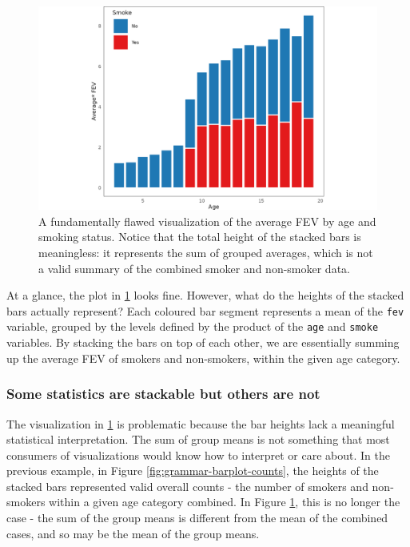 \documentclass[
]{book}
\theoremstyle{definition}
\theoremstyle{definition}
\theoremstyle{definition}
\theoremstyle{definition}
\theoremstyle{remark}
\begin{document}
\begin{figure}

{\centering \includegraphics[width=1\linewidth,height=1\textheight]{./figures/grammar-barplot-means} 

}

\caption{A fundamentally flawed visualization of the average FEV by age and smoking status. Notice that the total height of the stacked bars is meaningless: it represents the sum of grouped averages, which is not a valid summary of the combined smoker and non-smoker data.}\label{fig:grammar-barplot-means}
\end{figure}

At a glance, the plot in \ref{fig:grammar-barplot-means} looks fine. However, what do the heights of the stacked bars actually represent? Each coloured bar segment represents a mean of the \texttt{fev} variable, grouped by the levels defined by the product of the \texttt{age} and \texttt{smoke} variables. By stacking the bars on top of each other, we are essentially summing up the average FEV of smokers and non-smokers, within the given age category.

\subsubsection{Some statistics are stackable but others are not}\label{some-statistics-are-stackable-but-others-are-not}

The visualization in \ref{fig:grammar-barplot-means} is problematic because the bar heights lack a meaningful statistical interpretation. The sum of group means is not something that most consumers of visualizations would know how to interpret or care about. In the previous example, in Figure \ref{fig:grammar-barplot-counts}, the heights of the stacked bars represented valid overall counts - the number of smokers and non-smokers within a given age category combined. In Figure \ref{fig:grammar-barplot-means}, this is no longer the case - the sum of the group means is different from the mean of the combined cases, and so may be the mean of the group means.
\end{document}
